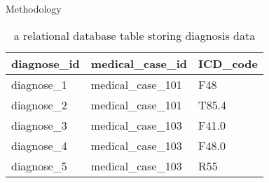 \documentclass{beamer}
\begin{document}
\begin{frame}{Methodology}
\begin{table}
{      \begin{tabular}{| l | l | l |}
        \hline
        diagnose\_id & medical\_case\_id  & ICD\_code \\ \hline
        diagnose\_1  & medical\_case\_101 & F48      \\
        diagnose\_2  & medical\_case\_101 & T85.4    \\
        diagnose\_3  & medical\_case\_103 & F41.0    \\
        diagnose\_4  & medical\_case\_103 & F48.0    \\
        diagnose\_5  & medical\_case\_103 & R55      \\
        \hline
      \end{tabular}}
    \caption {a relational database table storing diagnosis data}
    \label{table3}
  \end{table}
  

\end{frame}
% 







\end{document}
